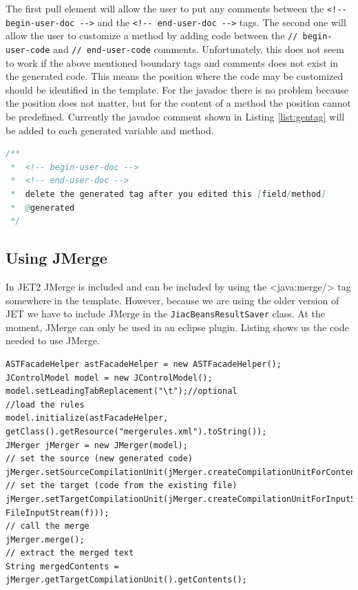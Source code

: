 The first pull element will allow the user to put any comments between the \verb|<!-- begin-user-doc -->| and the \verb|<!-- end-user-doc -->| tags. %
The second one will allow the user to customize a method by adding code between the  \verb|// begin-user-code| and \verb|// end-user-code| comments. Unfortunately, this does not seem to work if the above mentioned boundary tags and comments does not exist in the generated code. This means the position where the code may be customized should be identified in the template. For the javadoc there is no problem because the position does not matter, but for the content of a method the position cannot be predefined. Currently the javadoc comment shown in Listing \ref{list:gentag} will be added to each generated variable and method.

\begin{lstlisting}[language=Java, caption = javadoc comment used for JMerge]
/**
 *  <!-- begin-user-doc -->
 *  <!-- end-user-doc -->
 *	delete the generated tag after you edited this [field/method]
 *  @generated
 */
\end{lstlisting}

\subsection{Using JMerge}
In JET2 JMerge is included and can be included by using the <java:merge/> tag somewhere in the template. However, because we are using the older version of JET we have to include JMerge in the \verb|JiacBeansResultSaver| class. At the moment, JMerge can only be used in an eclipse plugin. Listing shows us the code needed to use JMerge.
\begin{lstlisting}
ASTFacadeHelper astFacadeHelper = new ASTFacadeHelper();
JControlModel model = new JControlModel(); 
model.setLeadingTabReplacement("\t");//optional
//load the rules
model.initialize(astFacadeHelper, getClass().getResource("mergerules.xml").toString());
JMerger jMerger = new JMerger(model); 
// set the source (new generated code)
jMerger.setSourceCompilationUnit(jMerger.createCompilationUnitForContents(content));
// set the target (code from the existing file)
jMerger.setTargetCompilationUnit(jMerger.createCompilationUnitForInputStream(new FileInputStream(f))); 
// call the merge
jMerger.merge(); 
// extract the merged text
String mergedContents = jMerger.getTargetCompilationUnit().getContents();
\end{lstlisting}

